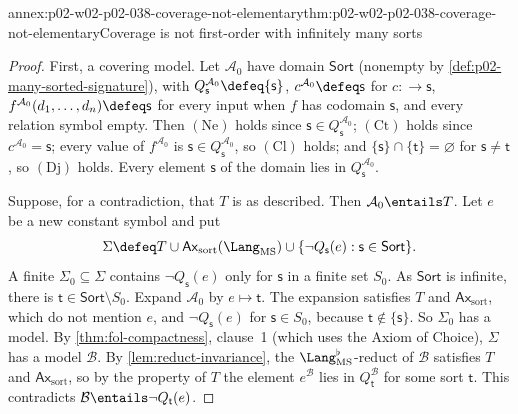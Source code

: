 \begin{annexitem}{annex:p02-w02-p02-038-coverage-not-elementary}{thm:p02-w02-p02-038-coverage-not-elementary}{Coverage is not first-order with infinitely many sorts}
\begin{proof}
First, a covering model.  Let \(\mathcal A_0\) have domain
\(\mathsf{Sort}\) (nonempty by \cref{def:p02-many-sorted-signature}), with
\(Q_{\mathsf s}^{\mathcal A_0}\defeq\{\mathsf s\}\),
\(c^{\mathcal A_0}\defeq\mathsf s\) for \(c:\longrightarrow\mathsf s\),
\(f^{\mathcal A_0}(d_1,\ldots,d_n)\defeq\mathsf s\) for every input when
\(f\) has codomain \(\mathsf s\), and every relation symbol empty.  Then
\((\mathrm{Ne})\) holds since \(\mathsf s\in Q_{\mathsf s}^{\mathcal A_0}\);
\((\mathrm{Ct})\) holds since \(c^{\mathcal A_0}=\mathsf s\); every value of
\(f^{\mathcal A_0}\) is \(\mathsf s\in Q_{\mathsf s}^{\mathcal A_0}\), so
\((\mathrm{Cl})\) holds; and \(\{\mathsf s\}\cap\{\mathsf t\}=\varnothing\)
for \(\mathsf s\ne\mathsf t\), so \((\mathrm{Dj})\) holds.  Every element
\(\mathsf s\) of the domain lies in \(Q_{\mathsf s}^{\mathcal A_0}\).

Suppose, for a contradiction, that \(T\) is as described.  Then
\(\mathcal A_0\entails T\).  Let \(e\) be a new constant symbol and put
\[
 \Sigma\defeq T\cup\mathsf{Ax}_{\mathrm{sort}}(\Lang_{\mathrm{MS}})\cup
 \{\neg Q_{\mathsf s}(e):\mathsf s\in\mathsf{Sort}\}.
\]
A finite \(\Sigma_0\subseteq\Sigma\) contains \(\neg Q_{\mathsf s}(e)\) only
for \(\mathsf s\) in a finite set \(S_0\).  As \(\mathsf{Sort}\) is
infinite, there is \(\mathsf t\in\mathsf{Sort}\setminus S_0\).  Expand
\(\mathcal A_0\) by \(e\mapsto\mathsf t\).  The expansion satisfies \(T\) and
\(\mathsf{Ax}_{\mathrm{sort}}\), which do not mention \(e\), and
\(\neg Q_{\mathsf s}(e)\) for \(\mathsf s\in S_0\), because
\(\mathsf t\notin\{\mathsf s\}\).  So \(\Sigma_0\) has a model.  By
\cref{thm:fol-compactness}, clause~1 (which uses the Axiom of Choice),
\(\Sigma\) has a model \(\mathcal B\).  By \cref{lem:reduct-invariance}, the
\(\Lang_{\mathrm{MS}}^{\flat}\)-reduct of \(\mathcal B\) satisfies \(T\) and
\(\mathsf{Ax}_{\mathrm{sort}}\), so by the property of \(T\) the element
\(e^{\mathcal B}\) lies in \(Q_{\mathsf t}^{\mathcal B}\) for some sort
\(\mathsf t\).  This contradicts \(\mathcal B\entails\neg Q_{\mathsf t}(e)\).
\end{proof}
\end{annexitem}

